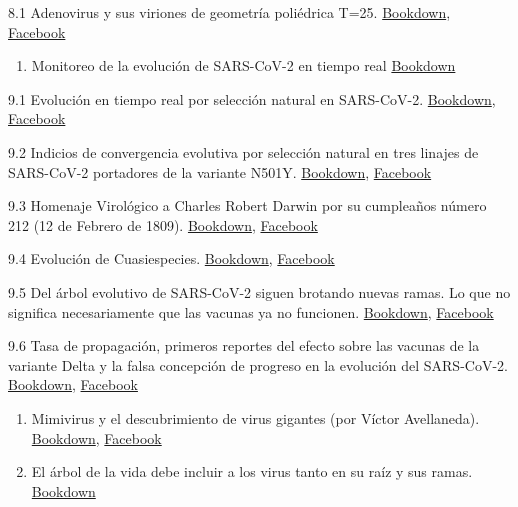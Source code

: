 \documentclass[
  12pt, krantz2,
  spanish,
]{krantz}
\providecommand{\tightlist}{%
  \setlength{\itemsep}{0pt}\setlength{\parskip}{0pt}}
\begin{document}
8.1 Adenovirus y sus viriones de geometría poliédrica T=25. \href{}{Bookdown}, \href{https://www.facebook.com/permalink.php?story_fbid=162961568761999\&id=107088044349352}{Facebook}

\begin{enumerate}
\def\labelenumi{\arabic{enumi}.}
\setcounter{enumi}{8}
\tightlist
\item
  Monitoreo de la evolución de SARS-CoV-2 en tiempo real \href{}{Bookdown}
\end{enumerate}

9.1 Evolución en tiempo real por selección natural en SARS-CoV-2. \href{}{Bookdown}, \href{https://www.facebook.com/permalink.php?story_fbid=176697107388445\&id=107088044349352}{Facebook}

9.2 Indicios de convergencia evolutiva por selección natural en tres linajes de SARS-CoV-2 portadores de la variante N501Y. \href{}{Bookdown}, \href{https://www.facebook.com/permalink.php?story_fbid=249352400122915\&id=107088044349352}{Facebook}

9.3 Homenaje Virológico a Charles Robert Darwin por su cumpleaños número 212 (12 de Febrero de 1809). \href{}{Bookdown}, \href{https://www.facebook.com/permalink.php?story_fbid=257534675971354\&id=107088044349352}{Facebook}

9.4 Evolución de Cuasiespecies. \href{}{Bookdown}, \href{https://www.facebook.com/BioViral/posts/180308757429775}{Facebook}

9.5 Del árbol evolutivo de SARS-CoV-2 siguen brotando nuevas ramas. Lo que no significa necesariamente que las vacunas ya no funcionen. \href{}{Bookdown}, \href{https://www.facebook.com/BioViral/posts/200426228751361}{Facebook}

9.6 Tasa de propagación, primeros reportes del efecto sobre las vacunas de la variante Delta y la falsa concepción de progreso en la evolución del SARS-CoV-2. \href{}{Bookdown}, \href{https://www.facebook.com/BioViral/posts/213300734130577}{Facebook}

\begin{enumerate}
\def\labelenumi{\arabic{enumi}.}
\setcounter{enumi}{9}
\item
  Mimivirus y el descubrimiento de virus gigantes (por Víctor Avellaneda). \href{}{Bookdown}, \href{https://www.facebook.com/permalink.php?story_fbid=148814966843326\&id=107088044349352}{Facebook}
\item
  El árbol de la vida debe incluir a los virus tanto en su raíz y sus ramas. \href{}{Bookdown}
\end{enumerate}
\end{document}
